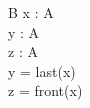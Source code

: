 \begin{zed}
[A]
\end{zed}

 \begin{schema}{B}
  x : \seq A \\
  y : A \\
  z : \seq A \\
 \where
  y = last(x) \\
  z = front(x) \\
 \end{schema}